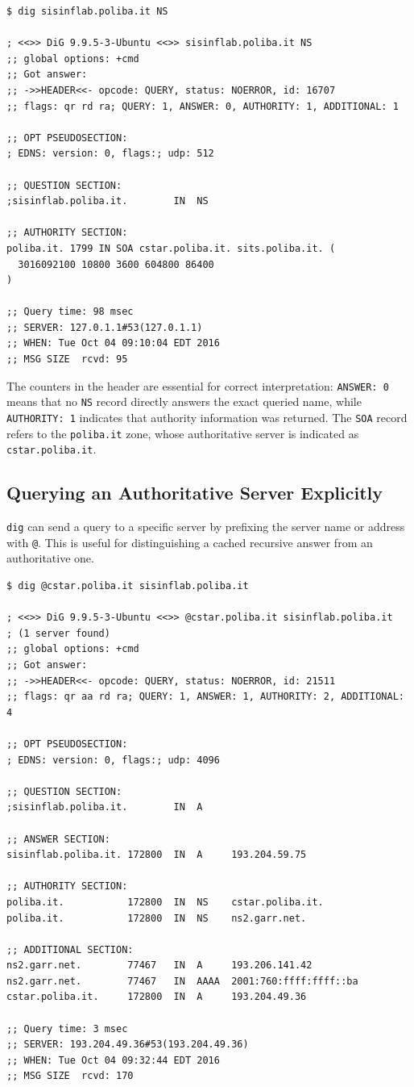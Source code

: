 \documentclass{scrbook}
\begin{document}
	\begin{lstlisting}
$ dig sisinflab.poliba.it NS

; <<>> DiG 9.9.5-3-Ubuntu <<>> sisinflab.poliba.it NS
;; global options: +cmd
;; Got answer:
;; ->>HEADER<<- opcode: QUERY, status: NOERROR, id: 16707
;; flags: qr rd ra; QUERY: 1, ANSWER: 0, AUTHORITY: 1, ADDITIONAL: 1

;; OPT PSEUDOSECTION:
; EDNS: version: 0, flags:; udp: 512

;; QUESTION SECTION:
;sisinflab.poliba.it.        IN  NS

;; AUTHORITY SECTION:
poliba.it. 1799 IN SOA cstar.poliba.it. sits.poliba.it. (
  3016092100 10800 3600 604800 86400
)

;; Query time: 98 msec
;; SERVER: 127.0.1.1#53(127.0.1.1)
;; WHEN: Tue Oct 04 09:10:04 EDT 2016
;; MSG SIZE  rcvd: 95
	\end{lstlisting}
	
	The counters in the header are essential for correct interpretation: \texttt{ANSWER: 0} means that no \texttt{NS} record directly answers the exact queried name, while \texttt{AUTHORITY: 1} indicates that authority information was returned. The \texttt{SOA} record refers to the \texttt{poliba.it} zone, whose authoritative server is indicated as \texttt{cstar.poliba.it}.
	
	\subsection{Querying an Authoritative Server Explicitly}
	
	\texttt{dig} can send a query to a specific server by prefixing the server name or address with \texttt{@}. This is useful for distinguishing a cached recursive answer from an authoritative one.
	
	\begin{lstlisting}
$ dig @cstar.poliba.it sisinflab.poliba.it

; <<>> DiG 9.9.5-3-Ubuntu <<>> @cstar.poliba.it sisinflab.poliba.it
; (1 server found)
;; global options: +cmd
;; Got answer:
;; ->>HEADER<<- opcode: QUERY, status: NOERROR, id: 21511
;; flags: qr aa rd ra; QUERY: 1, ANSWER: 1, AUTHORITY: 2, ADDITIONAL: 4

;; OPT PSEUDOSECTION:
; EDNS: version: 0, flags:; udp: 4096

;; QUESTION SECTION:
;sisinflab.poliba.it.        IN  A

;; ANSWER SECTION:
sisinflab.poliba.it. 172800  IN  A     193.204.59.75

;; AUTHORITY SECTION:
poliba.it.           172800  IN  NS    cstar.poliba.it.
poliba.it.           172800  IN  NS    ns2.garr.net.

;; ADDITIONAL SECTION:
ns2.garr.net.        77467   IN  A     193.206.141.42
ns2.garr.net.        77467   IN  AAAA  2001:760:ffff:ffff::ba
cstar.poliba.it.     172800  IN  A     193.204.49.36

;; Query time: 3 msec
;; SERVER: 193.204.49.36#53(193.204.49.36)
;; WHEN: Tue Oct 04 09:32:44 EDT 2016
;; MSG SIZE  rcvd: 170
	\end{lstlisting}
	
\end{document}
